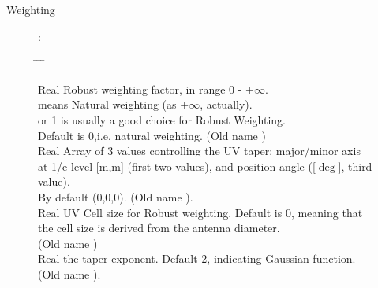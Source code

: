 \begin{description}
\item[Weighting]:\mbox{}
\begin{tabbing}
\hspace{0.cm} \= \hspace{3.4cm} \= \hspace{2cm} \= \kill

\>   \>  Real \> Robust weighting factor, in range 0 - $+ \infty$. \\ 
	      \>  \>   means  Natural weighting (as $+ \infty$, actually).\\ 
	      \> \>  or 1 is usually a good choice for Robust Weighting. \\
	      \>  \> \> Default is 0,i.e. natural weighting. (Old name ) \\
\>  \> [3] Real \>  Array of 3 values controlling the UV taper: major/minor axis \\
                \> \> \> at 1/e level [m,m] (first two values), and position angle ([${\deg}$], third value). \\
                \> \> \> By default (0,0,0). (Old name ). \\
\>   \> [2] Real \>  UV Cell size for Robust weighting. Default is 0, meaning that  \\
              \> \> \> the cell size is derived from the antenna diameter. \\
                \> \> \> (Old name ) \\
\>  \> Real \>  the taper exponent. Default 2, indicating Gaussian function. \\
                \> \> \> (Old name ). \\
\end{tabbing}
\end{description}

